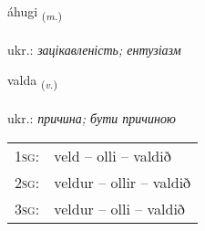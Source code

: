\documentclass[frontgrid, backgrid]{flacards}\usepackage[]{graphicx}\usepackage[]{xcolor}
\begin{document}
\renewcommand{\flhead}{\vskip5pt \fboxsep=0pt {\small\bfseries\footnotesize Nafnorð | іменник}}
\renewcommand{\fcfoot}{\vskip5pt \fboxsep=0pt \hspace{2pt}{\small\bfseries\footnotesize 1K}}

\renewcommand{\blhead}{\vskip5pt {\small\bfseries\footnotesize Nafnorð | іменник }}
\renewcommand{\bcfoot}{\vskip5pt \hspace{2pt}{\small\bfseries\footnotesize 1K}}


{áhugi \small{\textsubscript{(\textit{m.})}} \\[1ex] %
\textphonetic{[auːhʏijɪ]} \\
ukr.: \emph{зацікавленість; ентузіазм} \\  [2ex]
\renewcommand*{\arraystretch}{0.8}
}

\renewcommand{\flhead}{\vskip5pt \fboxsep=0pt {\small\bfseries\footnotesize Sagnorð | дієслово}}
\renewcommand{\fcfoot}{\vskip5pt \fboxsep=0pt \hspace{2pt}{\small\bfseries\footnotesize 1K}}

\renewcommand{\blhead}{\vskip5pt {\small\bfseries\footnotesize Sagnorð | дієслово }}
\renewcommand{\bcfoot}{\vskip5pt \hspace{2pt}{\small\bfseries\footnotesize 1K}}


{valda \small{\textsubscript{(\textit{v.})}} \\[1ex] %
\textphonetic{[valta]} \\
ukr.: \emph{причина; бути причиною} \\  [2ex]
\renewcommand*{\arraystretch}{0.8}
\begin{tabular}{p{1cm}l}
\textsc{1sg}: & veld -- olli -- valdið \\ 
\textsc{2sg}: & veldur -- ollir -- valdið \\ 
\textsc{3sg}: & veldur -- olli -- valdið \\ 
\end{tabular}
}
\end{document}
